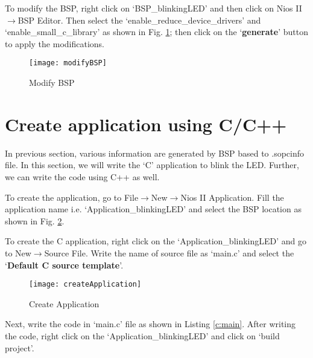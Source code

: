 To modify the BSP, right click on `BSP\_blinkingLED' and then click on Nios II$\rightarrow$BSP Editor. Then select the `enable\_reduce\_device\_drivers' and `enable\_small\_c\_library' as shown in Fig. \ref{fig:modifyBSP}; then click on the `\textbf{generate}' button to apply the modifications. 
\begin{figure}[!h]
	\centering
	\texttt{[image: modifyBSP]}
	\caption{Modify BSP}
	\label{fig:modifyBSP}
\end{figure}



\section{Create application using C/C++}\label{sec:AddApplication}
In previous section, various information are generated by BSP based to .sopcinfo file. In this section, we will write the `C' application to blink the LED. Further, we can write the code using C++ as well. 

To create the application, go to File$\rightarrow$New$\rightarrow$Nios II Application. Fill the application name i.e. `Application\_blinkingLED' and select the BSP location as shown in Fig. \ref{fig:createApplication}. 

To create the C application, right click on the `Application\_blinkingLED' and go to New$\rightarrow$Source File. Write the name of source file as `main.c' and select the `\textbf{Default C source template}'.

\begin{figure}[!h]
	\centering
	\texttt{[image: createApplication]}
	\caption{Create Application}
	\label{fig:createApplication}
\end{figure}

Next, write the code in `main.c' file as shown in Listing \ref{c:main}. After writing the code, right click on the `Application\_blinkingLED' and click on `build project'. 

